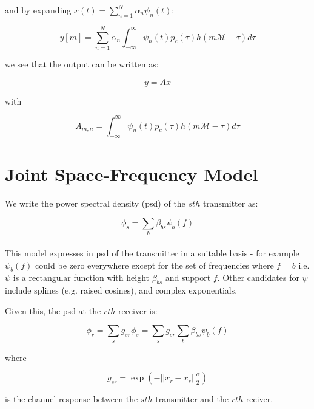 and by expanding \(x\left(t\right) = \sum_{n=1}^N \alpha_n \psi_n\left(t\right)\):

\begin{equation}
y\left[m\right] =  \sum_{n=1}^N \alpha_n \int_{-\infty}^{\infty} \psi_n\left(t\right)p_c\left(\tau\right)h\left(m\mathcal{M} - \tau\right)d\tau
\end{equation}

we see that the output can be written as:

\begin{equation}
y = Ax
\end{equation}

with

\begin{equation}
A_{m,n} = \int_{-\infty}^{\infty} \psi_n\left(t\right)p_c\left(\tau\right)h\left(m\mathcal{M} - \tau\right)d\tau
\end{equation}

\section{Joint Space-Frequency Model}
We write the power spectral density (psd) of the \(sth\) transmitter as:

\begin{equation}
\phi_s = \sum_b \beta_{bs} \psi_b\left(f\right)
\label{basis_expansion}
\end{equation}
\\ 

This model expresses in psd of the transmitter in a suitable basis - for example \(\psi_b\left(f\right)\) could be zero everywhere except for the set of frequencies where \(f=b\) i.e. \(\psi\) is a rectangular function with height \(\beta_{bs}\) and support \(f\). Other candidates for \(\psi\) include splines (e.g. raised cosines), and complex exponentials. 

Given this, the psd at the \(rth\) receiver is:

\begin{equation}
\phi_r = \sum_s g_{sr}\phi_s = \sum_s g_{sr} \sum _b \beta_{bs}\psi_b\left(f\right)
\end{equation}

where

\begin{equation}
g_{sr} = \exp\left(-||x_r - x_s||_2^\alpha\right)
\end{equation}

is the channel response between the \(sth\) transmitter and the \(rth\) reciver.

